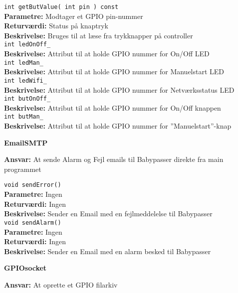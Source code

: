 \verb+int getButValue( int pin ) const +\\
\textbf{Parametre:}   Modtager et GPIO pin-nummer \\
\textbf{Returværdi:}  Status på knaptryk \\
\textbf{Beskrivelse:} Bruges til at læse fra trykknapper på controller  \\

\verb+int ledOnOff_ +\\
\textbf{Beskrivelse:} Attribut til at holde GPIO nummer for On/Off LED \\

\verb+int ledMan_ +\\
\textbf{Beskrivelse:} Attribut til at holde GPIO nummer for Manuelstart LED \\

\verb+int ledWifi_ +\\
\textbf{Beskrivelse:} Attribut til at holde GPIO nummer for Netværksstatus LED\\

\verb+int butOnOff_ +\\
\textbf{Beskrivelse:} Attribut til at holde GPIO nummer for On/Off knappen \\

\verb+int butMan_ +\\
\textbf{Beskrivelse:} Attribut til at holde GPIO nummer for ''Manuelstart''-knap \\

{\centering
\textbf{EmailSMTP}\par
}
\textbf{Ansvar:} At sende Alarm og Fejl emails til Babypasser direkte fra main programmet \

\verb+void sendError() +\\
\textbf{Parametre:}   Ingen \\
\textbf{Returværdi:}  Ingen \\
\textbf{Beskrivelse:} Sender en Email med en fejlmeddelelse til Babypasser \\

\verb+void sendAlarm() +\\
\textbf{Parametre:}   Ingen \\
\textbf{Returværdi:}  Ingen \\
\textbf{Beskrivelse:} Sender en Email med en alarm besked til Babypasser \\

{\centering
\textbf{GPIOsocket}\par
}
\textbf{Ansvar:} At oprette et GPIO filarkiv \

